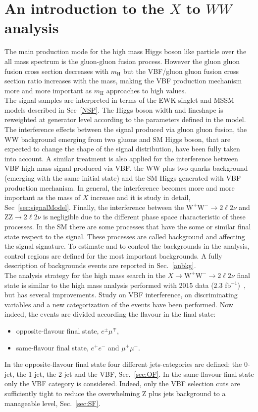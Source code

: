 \section{An introduction to the $X$ to $WW$ analysis }\label{sec:AnalysisStrategy_Intro}
The main production mode for the high mass Higgs boson like particle over the all mass spectrum is the gluon-gluon fusion process. 
However the  gluon gluon fusion cross section decreases with $m_\mathrm{H}$ but the VBF/gluon gluon fusion cross section ratio increases with the mass, making the VBF production mechanism more and more important as $m_\mathrm{H}$ approaches to high values.\\
The signal samples are interpreted in terms of the EWK singlet and MSSM models described in Sec~\ref{NSP}. 
The Higgs boson width and lineshape is reweighted at generator level according to the parameters defined in the model.
The interference effects between the signal produced  via gluon gluon fusion, the WW background emerging from two gluons and SM
Higgs boson, that are expected to change the shape of the signal distribution, have been fully taken into account. 
A similar treatment is also applied for the interference between VBF high mass signal produced via VBF, the  WW plus two quarks background (emerging with the same initial state)  and the SM Higgs generated with  VBF production mechanism. In general, the interference becomes more and more important as the mass of $X$ increase and it is study in detail, Sec~\ref{sec:signalModel}.
Finally, the interference between the $\mathrm{W^+W^-}\to2\ell2\nu$ and $\mathrm{ZZ}\to2\ell2\nu$ is negligible due to the different phase space characteristic of these processes. In the SM there are some processes that have the some or similar final state respect to the signal. These processes are called background and affecting the signal signature. To estimate and to control the backgrounds in the analysis, control regions are defined for the most important backgrounds. A fully description of backgrounds events are reported in Sec.~\ref{anbkg}. \\
\newline
The analysis strategy for the high mass search in the $X \to \mathrm{W^+W^-}\to2\ell2\nu$ final state is similar to the high
mass analysis performed with 2015 data (2.3 fb$^{-1}$)~\cite{CMS-PAS-HIG-16-023}, but has several improvements. Study on VBF interference, on discriminating variables and a new categorization of the events have been performed.
Now indeed, the events are divided according the flavour in the final state: 
\begin{itemize}
\item opposite-flavour final state, $e^{\pm} \mu^{\mp}$,
\item same-flavour final state, $e^+ e^-$ and  $\mu^+ \mu^-$. 
\end{itemize}
In the opposite-flavour final state four different jets-categories are defined: the 0-jet, the 1-jet, the 2-jet and the VBF, Sec.~\ref{sec:OF}. 
In the same-flavour final state only the VBF category is considered. Indeed, only the VBF selection cuts are sufficiently tight to reduce the  overwhelming Z plus jets background to a manageable level, Sec.~\ref{sec:SF}.




